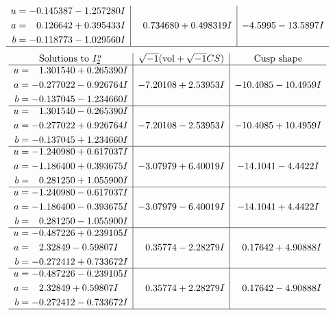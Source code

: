 \documentclass[1p]{elsarticle_modified}
\theoremstyle{definition}
\newcommand{\I}{\sqrt{-1}}
\begin{document}
$$\begin{array}{c|c|c}
\begin{aligned}
u &= -0.145387 - 1.257280 I \\
a &= \phantom{-}0.126642 + 0.395433 I \\
b &= -0.118773 - 1.029560 I\end{aligned}
 & \phantom{-}0.734680 + 0.498319 I & -4.5995 - 13.5897 I\\
 \hline 
 \end{array}$$\newpage$$\begin{array}{c|c|c}  
\text{Solutions to }I^u_{2}& \I (\text{vol} + \sqrt{-1}CS) & \text{Cusp shape}\\
 \hline 
\begin{aligned}
u &= \phantom{-}1.301540 + 0.265390 I \\
a &= -0.277022 - 0.926764 I \\
b &= -0.137045 - 1.234660 I\end{aligned}
 & -7.20108 + 2.53953 I & -10.4085 - 10.4959 I \\ \hline\begin{aligned}
u &= \phantom{-}1.301540 - 0.265390 I \\
a &= -0.277022 + 0.926764 I \\
b &= -0.137045 + 1.234660 I\end{aligned}
 & -7.20108 - 2.53953 I & -10.4085 + 10.4959 I \\ \hline\begin{aligned}
u &= -1.240980 + 0.617037 I \\
a &= -1.186400 + 0.393675 I \\
b &= \phantom{-}0.281250 + 1.055900 I\end{aligned}
 & -3.07979 + 6.40019 I & -14.1041 - 4.4422 I \\ \hline\begin{aligned}
u &= -1.240980 - 0.617037 I \\
a &= -1.186400 - 0.393675 I \\
b &= \phantom{-}0.281250 - 1.055900 I\end{aligned}
 & -3.07979 - 6.40019 I & -14.1041 + 4.4422 I \\ \hline\begin{aligned}
u &= -0.487226 + 0.239105 I \\
a &= \phantom{-}2.32849 - 0.59807 I \\
b &= -0.272412 + 0.733672 I\end{aligned}
 & \phantom{-}0.35774 - 2.28279 I & \phantom{-}0.17642 + 4.90888 I \\ \hline\begin{aligned}
u &= -0.487226 - 0.239105 I \\
a &= \phantom{-}2.32849 + 0.59807 I \\
b &= -0.272412 - 0.733672 I\end{aligned}
 & \phantom{-}0.35774 + 2.28279 I & \phantom{-}0.17642 - 4.90888 I\\
 \hline 
 \end{array}$$\newpage
\end{document}
